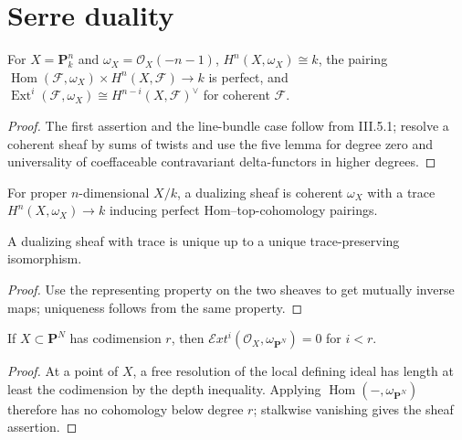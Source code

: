 \section{Serre duality}
\label{ha-ch3-sec7}
\begin{theorem}\label{ha-ch3-thm-duality-projective}
For $X=\mathbf P_k^n$ and $\omega_X=\mathcal O_X(-n-1)$,
$H^n(X,\omega_X)\cong k$, the pairing
$\operatorname{Hom}(\mathcal F,\omega_X)\times H^n(X,\mathcal F)\to k$
is perfect, and $\operatorname{Ext}^i(\mathcal F,\omega_X)\cong
H^{n-i}(X,\mathcal F)^\vee$ for coherent $\mathcal F$.

\end{theorem}
\begin{proof}
The first assertion and the line-bundle case follow from III.5.1;
resolve a coherent sheaf by sums of twists and use the five lemma for degree
zero and universality of coeffaceable contravariant delta-functors in higher
degrees.
\end{proof}
\begin{definition}\label{ha-ch3-def-dualizing}
For proper $n$-dimensional $X/k$, a dualizing sheaf is coherent $\omega_X$ with
a trace $H^n(X,\omega_X)\to k$ inducing perfect Hom--top-cohomology pairings.
\end{definition}
\begin{proposition}\label{ha-ch3-prop-dualizing-unique}
A dualizing sheaf with trace is unique up to a unique trace-preserving
isomorphism.
\end{proposition}
\begin{proof}
Use the representing property on the two sheaves to get
mutually inverse maps; uniqueness follows from the same property.
\end{proof}
\begin{lemma}\label{ha-ch3-lem-ext-codim}
If $X\subset\mathbf P^N$ has codimension $r$, then
$\mathcal E xt^i(\mathcal O_X,\omega_{\mathbf P^N})=0$ for $i<r$.

\end{lemma}
\begin{proof}

At a point of $X$, a free resolution of the local defining ideal has length at least the codimension
by the depth inequality.  Applying $\operatorname{Hom}(-,\omega_{\mathbf P^N})$ therefore has no
cohomology below degree $r$; stalkwise vanishing gives the sheaf assertion.

\end{proof}
